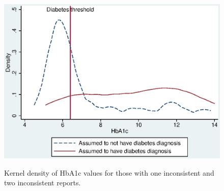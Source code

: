 \documentclass[12pt,english]{article}
\begin{document}
\begin{figure}[h!]
	\caption{\label{fig:kdens_inconsistency_hba1c}Kernel density of HbA1c values for those with one inconsistent and two inconsistent reports.}%
	\begin{center}
		\includegraphics[width=.7\linewidth]{figures/kdensity_hba1c_inconsist.eps}\\
	\end{center}
\end{figure}
\end{document}
